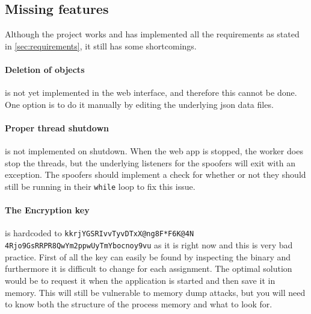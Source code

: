 \documentclass{article}
\begin{document}
\subsection{Missing features}
Although the project works and has implemented all the requirements as stated in \ref{sec:requirements}, it still has some shortcomings.

\paragraph{Deletion of objects} is not yet implemented in the web interface, and therefore this cannot be done. One option is to do it manually by editing the underlying \gls{json} data files.

\paragraph{Proper thread shutdown} is not implemented on shutdown. When the web app is stopped, the worker does stop the threads, but the underlying listeners for the spoofers will exit with an exception. The spoofers should implement a check for whether or not they should still be running in their \texttt{while} loop to fix this issue.

\paragraph{The Encryption key} is hardcoded to \texttt{kkrjYGSRIvvTyvDTxX@ng8F*F6K@4N 4Rjo9GsRRPR8QwYm2ppwUyTmYbocnoy9vu} as it is right now and this is very bad practice. First of all the key can easily be found by inspecting the binary and furthermore it is difficult to change for each assignment. The optimal solution would be to request it when the application is started and then save it in memory. This will still be vulnerable to memory dump attacks, but you will need to know both the structure of the process memory and what to look for.
\end{document}
